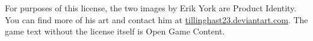 \documentclass{tufte-handout}
\begin{document}
\begin{fullwidth}
\begin{enumerate}
\end{enumerate}

\noindent For purposes of this license, the two images by Erik York
are Product Identity. You can find more of his art and contact him at
\href{http://tillinghast23.deviantart.com/}{tillinghast23.deviantart.com}.
The game text without the license itself is Open Game Content.

\end{fullwidth}

\nobibliography{}
\end{document}
